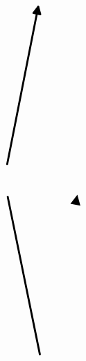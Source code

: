 \documentclass[10pt]{article}
\theoremstyle{plain}
\theoremstyle{remark}
\begin{document}
\[\begin{pgfpicture}
\begin{pgfscope}
\pgfsetlinewidth{2.007500pt}%
\definecolor{currentstroke}{rgb}{0.000000,0.000000,0.000000}%
\pgfsetstrokecolor{currentstroke}%
\pgfsetdash{}{0pt}%
\pgfpathmoveto{\pgfqpoint{2.362974in}{2.671516in}}%
\pgfpathlineto{\pgfqpoint{2.431324in}{2.759994in}}%
\pgfpathlineto{\pgfqpoint{2.461097in}{2.652228in}}%
\pgfpathlineto{\pgfqpoint{2.362974in}{2.671516in}}%
\pgfpathclose%
\pgfusepath{stroke,fill}%
\end{pgfscope}%
\begin{pgfscope}%
\pgfpathrectangle{\pgfqpoint{0.231031in}{0.187957in}}{\pgfqpoint{3.400139in}{5.640000in}} %
\pgfusepath{clip}%
\pgfsetroundcap%
\pgfsetroundjoin%
\pgfsetlinewidth{2.007500pt}%
\definecolor{currentstroke}{rgb}{0.000000,0.000000,0.000000}%
\pgfsetstrokecolor{currentstroke}%
\pgfsetdash{}{0pt}%
\pgfpathmoveto{\pgfqpoint{1.436744in}{3.225382in}}%
\pgfpathquadraticcurveto{\pgfqpoint{1.660977in}{4.363728in}}{\pgfqpoint{1.879208in}{5.471604in}}%
\pgfusepath{stroke}%
\end{pgfscope}%
\begin{pgfscope}%
\pgfpathrectangle{\pgfqpoint{0.231031in}{0.187957in}}{\pgfqpoint{3.400139in}{5.640000in}} %
\pgfusepath{clip}%
\pgfsetroundcap%
\pgfsetroundjoin%
\definecolor{currentfill}{rgb}{0.000000,0.000000,0.000000}%
\pgfsetfillcolor{currentfill}%
\pgfsetlinewidth{2.007500pt}%
\definecolor{currentstroke}{rgb}{0.000000,0.000000,0.000000}%
\pgfsetstrokecolor{currentstroke}%
\pgfsetdash{}{0pt}%
\pgfpathmoveto{\pgfqpoint{1.810824in}{5.383153in}}%
\pgfpathlineto{\pgfqpoint{1.879208in}{5.471604in}}%
\pgfpathlineto{\pgfqpoint{1.908939in}{5.363826in}}%
\pgfpathlineto{\pgfqpoint{1.810824in}{5.383153in}}%
\pgfpathclose%
\pgfusepath{stroke,fill}%
\end{pgfscope}%
\begin{pgfscope}%
\pgfpathrectangle{\pgfqpoint{0.231031in}{0.187957in}}{\pgfqpoint{3.400139in}{5.640000in}} %
\pgfusepath{clip}%
\pgfsetroundcap%
\pgfsetroundjoin%
\pgfsetlinewidth{2.007500pt}%
\definecolor{currentstroke}{rgb}{0.000000,0.000000,0.000000}%
\pgfsetstrokecolor{currentstroke}%
\pgfsetdash{}{0pt}%
\pgfpathmoveto{\pgfqpoint{1.902743in}{0.513595in}}%
\pgfpathquadraticcurveto{\pgfqpoint{1.670476in}{1.652207in}}{\pgfqpoint{1.444417in}{2.760389in}}%
\pgfusepath{stroke}%
\end{pgfscope}%
\begin{pgfscope}%
\pgfpathrectangle{\pgfqpoint{0.231031in}{0.187957in}}{\pgfqpoint{3.400139in}{5.640000in}} %
\pgfusepath{clip}%
\pgfsetroundcap%
\pgfsetroundjoin%
\definecolor{currentfill}{rgb}{0.000000,0.000000,0.000000}%

\end{pgfscope}
\end{pgfpicture}\]
\end{document}
